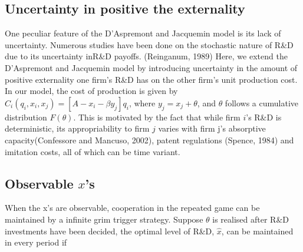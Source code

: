 \documentclass{article}
\begin{document}


\subsection{Uncertainty in positive the externality}

One peculiar feature of the D'Aspremont and Jacquemin model is its lack of uncertainty. Numerous studies have been done on the stochastic nature of R\&D due to its uncertainty inR\&D payoffs. (Reinganum, 1989) Here, we extend the D'Aspremont and Jacquemin model by introducing uncertainty in the amount of positive externality one firm's R\&D has on the other firm's unit production cost. In our model, the cost of production is given by $C_i(q_i, x_i, x_j) = [A - x_i - \beta y_j]q_i$, where $y_j = x_j + \theta$, and $\theta$ follows a cumulative distribution $F(\theta)$. This is motivated by the fact that while firm $i$'s R\&D is deterministic, its appropriability to firm $j$ varies with firm j's absorptive capacity(Confessore and Mancuso, 2002), patent regulations (Spence, 1984) and imitation costs, all of which can be time variant. 

\subsection{Observable $x$'s}

When the x's are observable, cooperation in the repeated game can be maintained by a infinite grim trigger strategy. Suppose $\theta$ is realised after R\&D investments have been decided, the optimal level of R\&D, $\hat{x}$, can be maintained in every period if 
\end{document}
